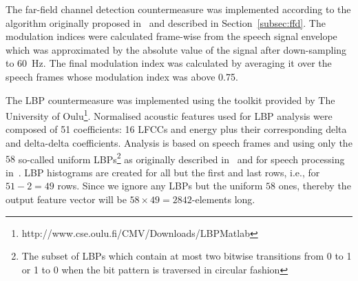 

The far-field channel detection countermeasure was implemented according to the algorithm originally proposed in~\cite{Villalba2011} and described in Section~\ref{subsec:ffd}. The modulation indices were calculated frame-wise  from the speech signal envelope which was approximated by the absolute value of the signal after down-sampling to 60~Hz.  The final modulation index was calculated by averaging it over the speech frames whose modulation index was above 0.75.  


The LBP countermeasure was implemented using the toolkit provided by The University of Oulu\footnote{http://www.cse.oulu.fi/CMV/Downloads/LBPMatlab}.
Normalised acoustic features used for LBP analysis were composed of 51 coefficients: 16 LFCCs and energy plus their corresponding delta and delta-delta coefficients.  Analysis is based on speech frames and using only the $58$ so-called uniform LBPs\footnote{The subset of LBPs which contain at most two bitwise transitions from 0 to 1 or 1 to 0 when the bit pattern is traversed in circular fashion} as originally described in~\cite{Ojala2002} and for speech processing in~\cite{Alegre2013a}.  %
LBP histograms are created for all but the first and last rows, i.e., for $51 - 2 = 49$ rows. Since we ignore any LBPs but the uniform $58$ ones, thereby the output feature vector will be $58 \times 49 = 2842$-elements long. 

